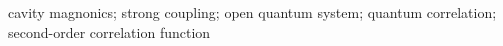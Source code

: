 \begin{abstract}
\end{abstract}



\begin{keywords}
cavity magnonics; strong coupling; open quantum system; quantum correlation; second-order correlation function
\end{keywords} 